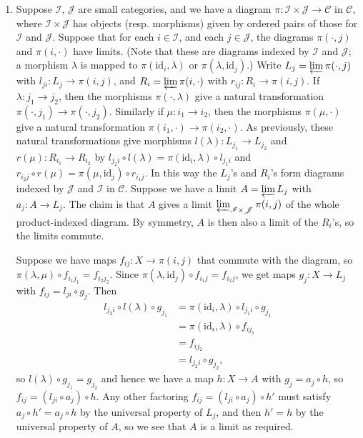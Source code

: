 \documentclass{report}
\newcommand{\id}{{\mathrm{id}}} %
\newcommand{\limit}{\varprojlim} %
\newcommand{\I}{\mathscr{I}}
\newcommand{\J}{\mathscr{J}}
\newcommand{\scrC}{\mathscr{C}}
\begin{document}
\begin{enumerate}[label=\textbf{1.6.\Alph*.}]
	\item Suppose $\I$, $\J$ are small categories, and we
	      have a diagram $\pi:\I\times\J\to\scrC$ in $\scrC$, where $\I\times\J$
	      has objects (resp. morphisms) given by ordered pairs of those for $\I$
	      and $\J$. Suppose that for each $i\in\I$, and each $j\in\J$, the
	      diagrams $\pi(\cdot,j)$ and $\pi(i,\cdot)$ have limits. (Note that
	      these are diagrams indexed by $\I$ and $\J$; a morphism $\lambda$ is
	      mapped to $\pi(\id_i,\lambda)$ or $\pi(\lambda,\id_j)$.) Write
	      $L_j=\limit\pi(\cdot,j)$ with $l_{ji}:L_j\to\pi(i,j)$, and
	      $R_i=\limit\pi(i,\cdot)$ with $r_{ij}:R_i\to\pi(i,j)$. If
	      $\lambda:j_1\to j_2$, then the morphisms $\pi(\cdot,\lambda)$ give a
	      natural transformation $\pi(\cdot,j_1)\to\pi(\cdot,j_2)$. Similarly if
	      $\mu:i_1\to i_2$, then the morphisms $\pi(\mu,\cdot)$ give a natural
	      transformation $\pi(i_1,\cdot)\to\pi(i_2,\cdot)$. As previously, these
	      natural transformations give morphisms $l(\lambda):L_{j_1}\to L_{j_2}$
	      and $r(\mu):R_{i_1}\to R_{i_2}$ by
	      $l_{j_2i}\circ l(\lambda)=\pi(\id_i,\lambda)\circ l_{j_1i}$ and
	      $r_{i_2j}\circ r(\mu)=\pi(\mu,\id_j)\circ r_{i_1j}$. In this way the
	      $L_j$'s and $R_i$'s form diagrams indexed by $\J$ and
	      $\I$ in $\scrC$. Suppose we have a limit $A=\limit L_j$ with
	      $a_j:A\to L_j$. The claim is that $A$ gives a limit
	      $\limit_{\I\times\J}\pi(i,j)$ of the whole
	      product-indexed diagram. By symmetry, $A$ is then also a limit of the
	      $R_i$'s, so the limits commute.

	      Suppose we have maps $f_{ij}:X\to\pi(i,j)$ that commute with the
	      diagram, so $\pi(\lambda,\mu)\circ f_{i_1j_1}=f_{i_2j_2}$. Since
	      $\pi(\lambda,\id_j)\circ f_{i_1j}=f_{i_2j}$, we get maps $g_j:X\to L_j$
	      with $f_{ij}=l_{ji}\circ g_j$. Then
	      \begin{align*}
		      l_{j_2i}\circ l(\lambda)\circ g_{j_1}
		       & = \pi(\id_i,\lambda)\circ l_{j_1i}\circ g_{j_1} \\
		       & = \pi(\id_i,\lambda)\circ f_{ij_1}              \\
		       & = f_{ij_2}                                      \\
		       & = l_{j_2i}\circ g_{j_2},
	      \end{align*}
	      so $l(\lambda)\circ g_{j_1}=g_{j_2}$ and hence we have a map
	      $h:X\to A$ with $g_j=a_j\circ h$, so $f_{ij}=(l_{ji}\circ a_j)\circ h$.
	      Any other factoring $f_{ij}=(l_{ji}\circ a_j)\circ h'$ must satisfy
	      $a_j\circ h'=a_j\circ h$ by the universal property of $L_j$, and then
	      $h'=h$ by the universal property of $A$, so we see that $A$ is a limit
	      as required.


\end{enumerate}
\end{document}
